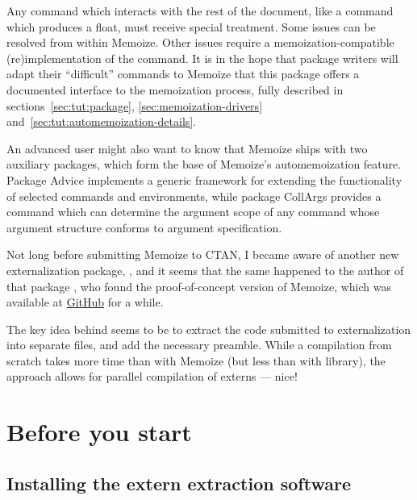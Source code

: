 \documentclass[a4paper,11pt]{article}
\begin{document}
  
\begin{tcolorbox}[
    title={\introboxtitle{How} can I make my command (auto)memoizable?},
  ]
  Any command which interacts with the rest of the document, like a command
  which produces a float, must receive special treatment.  Some issues can be
  resolved from within Memoize.  Other issues require a memoization-compatible
  (re)implementation of the command.  It is in the hope that package writers
  will adapt their ``difficult'' commands to Memoize that this package offers a
  documented interface to the memoization process, fully described in
  sections~\ref{sec:tut:package}, \ref{sec:memoization-drivers}
  and~\ref{sec:tut:automemoization-details}.

  An advanced user might also want to know that Memoize ships with two
  auxiliary packages, which form the base of Memoize's automemoization feature.
  Package Advice implements a generic framework for extending the functionality
  of selected commands and environments, while package CollArgs provides a
  command which can determine the argument scope of any command whose argument
  structure conforms to  argument specification.
\end{tcolorbox}

\begin{tcolorbox}[
    title={\introboxtitle{What else} is out there?},
  ]
  Not long before submitting Memoize to CTAN, I became aware of another new
  externalization package, , and it seems that the same
  happened to the author of that package \Smiley, who found the
  proof-of-concept version of Memoize, which was available
  at \href{https://github.com/sasozivanovic/memoize}{GitHub} for a while.
  
  The key idea behind  seems to be to extract the code
  submitted to externalization into separate files, and add the necessary
  preamble.  While a compilation from scratch takes more time than with Memoize
  (but less than with \TikZ library), the approach allows for parallel
  compilation of externs --- nice!
\end{tcolorbox}

\newpage
\tableofcontents


\section{Before you start}
\label{sec:setup}

\subsection{Installing the extern extraction software}
\label{sec:install}
\end{document}
